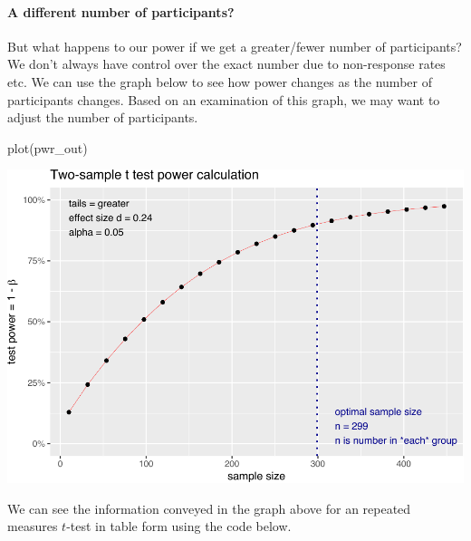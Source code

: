 \documentclass[
]{krantz}
\makeatletter
\newenvironment{Shaded}{\begin{snugshade}}{\end{snugshade}}
\newcommand{\FunctionTok}[1]{\textcolor[rgb]{0,0,0}{#1}}
\newcommand{\NormalTok}[1]{#1}
\newenvironment{kframe}{%
\medskip{}
\setlength{\fboxsep}{.8em}
 \def\at@end@of@kframe{}%
 \ifinner\ifhmode%
  \def\at@end@of@kframe{\end{minipage}}%
  \begin{minipage}{\columnwidth}%
 \fi\fi%
 \def\FrameCommand##1{\hskip\@totalleftmargin \hskip-\fboxsep
 \colorbox{shadecolor}{##1}\hskip-\fboxsep
     \hskip-\linewidth \hskip-\@totalleftmargin \hskip\columnwidth}%
 \MakeFramed {\advance\hsize-\width
   \@totalleftmargin\z@ \linewidth\hsize
   \@setminipage}}%
 {\par\unskip\endMakeFramed%
 \at@end@of@kframe}
\renewenvironment{Shaded}{\begin{kframe}}{\end{kframe}}
\makeatother
\begin{document}
\hypertarget{a-different-number-of-participants-1}{%
\paragraph{A different number of participants?}\label{a-different-number-of-participants-1}}

But what happens to our power if we get a greater/fewer number of participants? We don't always have control over the exact number due to non-response rates etc. We can use the graph below to see how power changes as the number of participants changes. Based on an examination of this graph, we may want to adjust the number of participants.

\begin{Shaded}
\begin{Highlighting}[]
\FunctionTok{plot}\NormalTok{(pwr\_out)}
\end{Highlighting}
\end{Shaded}

\includegraphics{bookdown_files/figure-latex/unnamed-chunk-347-1.pdf}

We can see the information conveyed in the graph above for an repeated measures \(t\)-test in table form using the code below.
\end{document}
